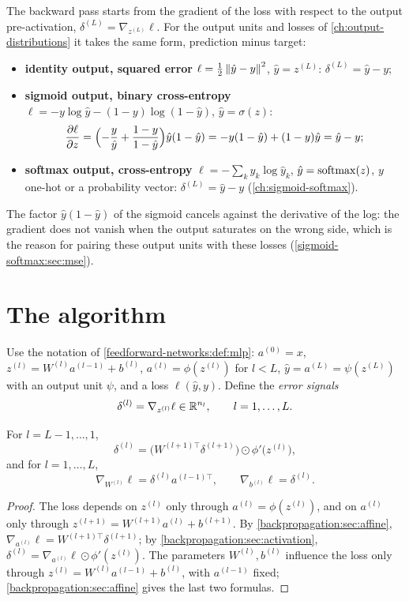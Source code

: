 \begin{notechapter}
The backward pass starts from the gradient of the loss with respect to the output
pre-activation, $\delta^{(L)} = \nabla_{z^{(L)}}\ell$. For the output units and losses of \cref{ch:output-distributions}
it takes the same form, prediction minus target:
\begin{itemize}
  \item \textbf{identity output, squared error} $\ell = \frac12\left\|\hat y - y\right\|^2$, $\hat y = z^{(L)}$: $\delta^{(L)} = \hat y - y$;
  \item \textbf{sigmoid output, binary cross-entropy} $\ell = -y\log\hat y - (1 - y)\log(1 - \hat y)$, $\hat y = \sigma(z)$:
        \[
          \frac{\partial\ell}{\partial z} = \Bigl(-\frac y{\hat y} + \frac{1 - y}{1 - \hat y}\Bigr)\hat y(1 - \hat y) = -y(1 - \hat y) + (1 - y)\hat y = \hat y - y ;
        \]
  \item \textbf{softmax output, cross-entropy} $\ell = -\sum_ky_k\log\hat y_k$, $\hat y = \operatorname{softmax}(z)$, $y$ one-hot or a
        probability vector: $\delta^{(L)} = \hat y - y$ (\cref{ch:sigmoid-softmax}).
\end{itemize}
The factor $\hat y(1 - \hat y)$ of the sigmoid cancels against the derivative of the log: the gradient does
not vanish when the output saturates on the wrong side, which is the reason for pairing
these output units with these losses (\cref{sigmoid-softmax:sec:mse}).

\section{The algorithm}\label{backpropagation:sec:algorithm}

Use the notation of \cref{feedforward-networks:def:mlp}: $a^{(0)} = x$, $z^{(l)} = W^{(l)}a^{(l-1)} + b^{(l)}$, $a^{(l)} = \phi(z^{(l)})$ for $l<L$,
$\hat y = a^{(L)} = \psi(z^{(L)})$ with an output unit $\psi$, and a loss $\ell(\hat y, y)$. Define the \emph{error signals}
\[
  \delta^{(l)} = \nabla_{z^{(l)}}\ell\in\mathbb{R}^{n_l},\qquad l = 1,\dots,L .
\]

\begin{theorem}[Backpropagation]\label{backpropagation:thm:backprop}
For $l = L - 1,\dots,1$,
\[
  \delta^{(l)} = \bigl(W^{(l+1)\top}\delta^{(l+1)}\bigr)\odot\phi'\bigl(z^{(l)}\bigr),
\]
and for $l = 1,\dots,L$,
\[
  \nabla_{W^{(l)}}\ell = \delta^{(l)}a^{(l-1)\top},\qquad\nabla_{b^{(l)}}\ell = \delta^{(l)} .
\]
\end{theorem}

\begin{proof}
The loss depends on $z^{(l)}$ only through $a^{(l)} = \phi(z^{(l)})$, and on $a^{(l)}$ only through
$z^{(l+1)} = W^{(l+1)}a^{(l)} + b^{(l+1)}$. By \cref{backpropagation:sec:affine}, $\nabla_{a^{(l)}}\ell = W^{(l+1)\top}\delta^{(l+1)}$; by
\cref{backpropagation:sec:activation}, $\delta^{(l)} = \nabla_{a^{(l)}}\ell\odot\phi'(z^{(l)})$. The parameters $W^{(l)}, b^{(l)}$ influence the loss
only through $z^{(l)} = W^{(l)}a^{(l-1)} + b^{(l)}$, with $a^{(l-1)}$ fixed; \cref{backpropagation:sec:affine} gives the last two
formulas.
\end{proof}


\end{notechapter}
